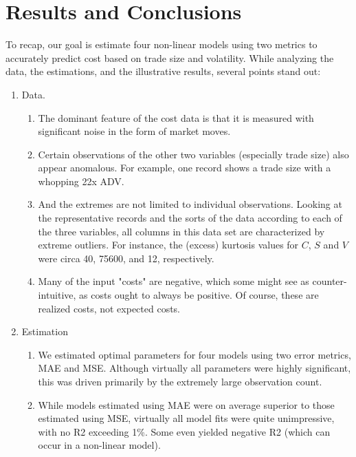 \documentclass[12pt]{article}
\begin{document}
\newpage
\section{Results and Conclusions}
To recap,  our goal is estimate four non-linear models using two metrics to accurately predict cost based on trade size and volatility. While analyzing the data, the estimations, and the illustrative results, several points stand out:

\begin{enumerate}

    \item   Data.  
    \begin{enumerate}
\item The dominant feature of the cost data is that it is measured with significant noise in the form of market moves.
\item Certain observations of the other two variables (especially trade size) also appear anomalous.   For example, one record shows a trade size with a whopping 22x ADV.

\item 
    And the extremes are not limited to individual observations.  Looking at the representative records and the sorts of the data according to each of the three variables, all columns in this data set are characterized by extreme outliers.   For instance, the (excess) kurtosis values for $C$, $S$ and $V$ were circa 40, 75600, and 12, respectively. 
    
\item Many of the input "costs" are negative, which some might see as counter-intuitive,  as costs ought to always be positive.   Of course, these are realized costs, not expected costs. 



\end{enumerate}

\item Estimation
\begin{enumerate}
    \item We estimated optimal parameters for four models using two error metrics, MAE and MSE.  Although virtually all parameters were highly significant, this was driven primarily by the extremely large observation count.  
    
    \item While models estimated using MAE were on average superior to those estimated using MSE, virtually all model fits were quite  unimpressive, with no R2 exceeding 1\%.  Some even yielded negative R2 (which can occur in a non-linear model).  


\end{enumerate}
\end{enumerate}
\end{document}
